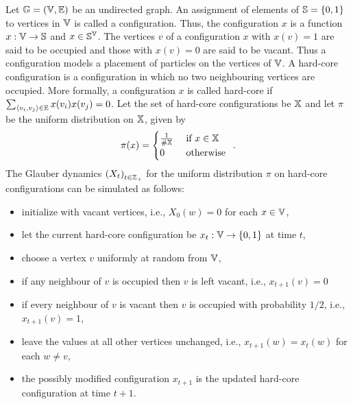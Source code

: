 \begin{model}\label{M:GlauberDynamicsHardcore}
Let $\mathbb{G} = (\mathbb{V},\mathbb{E})$ be an undirected graph.  
An assignment of elements of $\mathbb{S}=\{0,1\}$ to vertices in $\mathbb{V}$ is called a configuration.  
Thus, the configuration $x$ is a function $x: \mathbb{V} \to \mathbb{S}$ and $x \in \mathbb{S}^{\mathbb{V}}$. 
The vertices $v$ of a configuration $x$ with $x(v)=1$ are said to be occupied and those with $x(v)=0$ are said to be vacant.  
Thus a configuration models a placement of particles on the vertices of $\mathbb{V}$.  
A hard-core configuration is a configuration in which no two neighbouring vertices are occupied.  
More formally, a configuration $x$ is called hard-core if $\sum_{\langle v_i ,v_j \rangle \in \mathbb{E}} x(v_i) x(v_j)=0$.  
Let the set of hard-core configurations be $\mathbb{X}$ and let $\pi$ be the uniform distribution on $\mathbb{X}$, given by
\[
\pi(x) = 
\begin{cases}
\frac{1}{\# \mathbb{X}} & \text{ if } x \in \mathbb{X} \\
0 & \text{ otherwise}
\end{cases} \enspace .
\] 
The Glauber dynamics $\left(X_t\right)_{t \in \mathbb{Z}_+}$ for the uniform distribution $\pi$ on hard-core configurations can be simulated as follows: 
\begin{itemize}
\item initialize with vacant vertices, i.e., $X_0(w)=0$ for each $x \in \mathbb{V}$,
\item let the current hard-core configuration be $x_t: \mathbb{V} \to \{0,1\}$ at time $t$,
\item choose a vertex $v$ uniformly at random from $\mathbb{V}$,
\item if any neighbour of $v$ is occupied then $v$ is left vacant, i.e., $x_{t+1}(v)=0$
\item if every neighbour of $v$ is vacant then $v$ is occupied with probability $1/2$, i.e., $x_{t+1}(v)=1$, 
\item leave the values at all other vertices unchanged, i.e., $x_{t+1}(w)=x_t(w)$ for each $w \neq v$, 
\item the possibly modified configuration $x_{t+1}$ is the updated hard-core configuration at time $t+1$.
\end{itemize}
\end{model}

